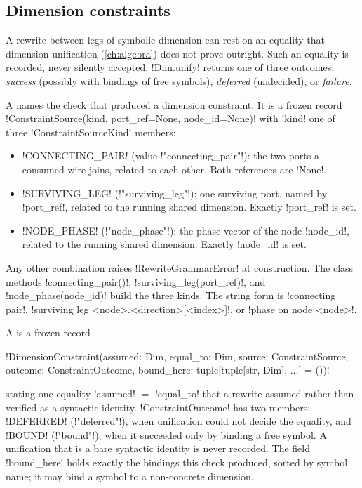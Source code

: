 \subsection{Dimension constraints}

A rewrite between legs of symbolic dimension can rest on an equality that dimension unification
(\cref{ch:algebra}) does not prove outright. Such an equality is recorded, never silently
accepted. \py!Dim.unify! returns one of three outcomes: \emph{success} (possibly with bindings of
free symbols), \emph{deferred} (undecided), or \emph{failure}.

\begin{definition}\label{def:rewriting-csource}
A  names the check that produced a dimension constraint. It is a frozen
record \py!ConstraintSource(kind, port_ref=None, node_id=None)! with \py!kind! one of three
\py!ConstraintSourceKind! members:
\begin{itemize}
\item \code!CONNECTING_PAIR! (value \code!"connecting_pair"!): the two ports a consumed wire joins,
  related to each other. Both references are \py!None!.
\item \code!SURVIVING_LEG! (\code!"surviving_leg"!): one surviving port, named by \py!port_ref!,
  related to the running shared dimension. Exactly \py!port_ref! is set.
\item \code!NODE_PHASE! (\code!"node_phase"!): the phase vector of the node \py!node_id!, related to
  the running shared dimension. Exactly \py!node_id! is set.
\end{itemize}
Any other combination raises \py!RewriteGrammarError! at construction. The class methods
\py!connecting_pair()!, \py!surviving_leg(port_ref)!, and \py!node_phase(node_id)! build the three
kinds. The string form is \code!connecting pair!, \code!surviving leg <node>.<direction>[<index>]!,
or \code!phase on node <node>!.
\end{definition}

\begin{definition}\label{def:rewriting-dconstraint}
A  is a frozen record
\begin{signature}
\py!DimensionConstraint(assumed: Dim, equal_to: Dim, source: ConstraintSource, outcome: ConstraintOutcome, bound_here: tuple[tuple[str, Dim], ...] = ())!
\end{signature}
stating one equality \py!assumed! $=$ \py!equal_to! that a rewrite assumed rather than verified as a
syntactic identity. \py!ConstraintOutcome! has two members: \code!DEFERRED! (\code!"deferred"!),
when unification could not decide the equality, and \code!BOUND! (\code!"bound"!), when it
succeeded only by binding a free symbol. A unification that is a bare syntactic identity is never
recorded. The field \py!bound_here! holds exactly the bindings this check produced, sorted by
symbol name; it may bind a symbol to a non-concrete dimension.
\end{definition}

